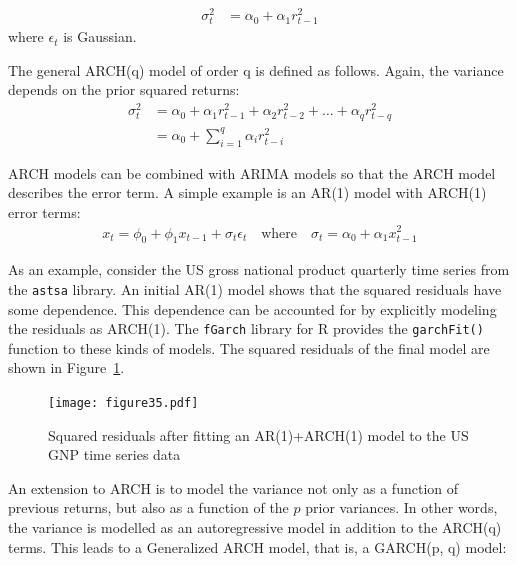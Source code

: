 \begin{align*}
\sigma_t^2 &= \alpha_0 + \alpha_1 r_{t-1}^2
\end{align*}
\noindent where $\epsilon_t$ is Gaussian.

The general ARCH(q) model of order q is defined as follows. Again, the variance depends on the prior squared returns:
\begin{align*}
\sigma_t^2 &= \alpha_0 + \alpha_1 r_{t-1}^2 + \alpha_2 r_{t-2}^2 + \ldots + \alpha_q r_{t-q}^2 \\
           &= \alpha_0 + \sum_{i=1}^q \alpha_i r_{t-i}^2
\end{align*}

ARCH models can be combined with ARIMA models so that the ARCH model describes the error term. A simple example is an AR(1) model with ARCH(1) error terms:
\begin{align*}
x_t = \phi_0 + \phi_1 x_{t-1} + \sigma_t \epsilon_t \quad \text{where} \quad \sigma_t = \alpha_0 + \alpha_1 x_{t-1}^2
\end{align*} 

As an example, consider the US gross national product quarterly time series from the \texttt{astsa} library. An initial AR(1) model shows that the squared residuals have some dependence. This dependence can be accounted for by explicitly modeling the residuals as ARCH(1). The \texttt{fGarch} library for R provides the \texttt{garchFit()} function to these kinds of models. The squared residuals of the final model are shown in Figure~\ref{fig:figure35}.

\begin{figure}
\centering
\centering
\texttt{[image: figure35.pdf]}
\caption[Squared residuals after fitting an AR(1)+ARCH(1) model]{Squared residuals after fitting an AR(1)+ARCH(1) model to the US GNP time series data}
\label{fig:figure35}
\end{figure}


An extension to ARCH is to model the variance not only as a function of previous returns, but also as a function of the $p$ prior variances. In other words, the variance is modelled as an autoregressive model in addition to the ARCH(q) terms. This leads to a Generalized ARCH model, that is, a GARCH(p, q) model:

